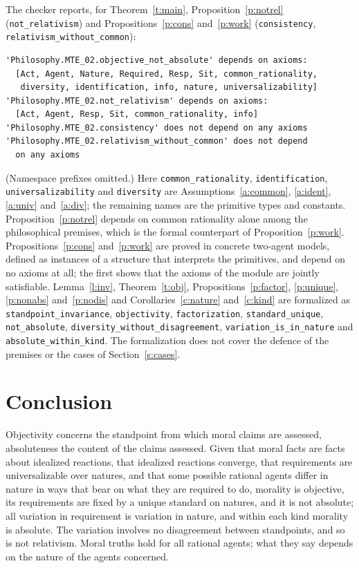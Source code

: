 \documentclass{situationist-preprint}
\begin{document}
\noindent The checker reports, for Theorem~\ref{t:main}, Proposition~\ref{p:notrel} (\texttt{not\_relativism}) and Propositions~\ref{p:cons} and~\ref{p:work} (\texttt{consistency}, \texttt{relativism\_without\_common}):

\begin{lstlisting}
'Philosophy.MTE_02.objective_not_absolute' depends on axioms:
  [Act, Agent, Nature, Required, Resp, Sit, common_rationality,
   diversity, identification, info, nature, universalizability]
'Philosophy.MTE_02.not_relativism' depends on axioms:
  [Act, Agent, Resp, Sit, common_rationality, info]
'Philosophy.MTE_02.consistency' does not depend on any axioms
'Philosophy.MTE_02.relativism_without_common' does not depend
  on any axioms
\end{lstlisting}

\begin{sloppypar}\noindent (Namespace prefixes omitted.) Here \texttt{common\_rationality}, \texttt{identification}, \texttt{universalizability} and \texttt{diversity} are Assumptions~\ref{a:common}, \ref{a:ident}, \ref{a:univ} and~\ref{a:div}; the remaining names are the primitive types and constants. Proposition~\ref{p:notrel} depends on common rationality alone among the philosophical premises, which is the formal counterpart of Proposition~\ref{p:work}. Propositions~\ref{p:cons} and~\ref{p:work} are proved in concrete two-agent models, defined as instances of a structure that interprets the primitives, and depend on no axioms at all; the first shows that the axioms of the module are jointly satisfiable. Lemma~\ref{l:inv}, Theorem~\ref{t:obj}, Propositions~\ref{p:factor}, \ref{p:unique}, \ref{p:nonabs} and~\ref{p:nodis} and Corollaries~\ref{c:nature} and~\ref{c:kind} are formalized as \texttt{standpoint\_invariance}, \texttt{objectivity}, \texttt{factorization}, \texttt{standard\_unique}, \texttt{not\_absolute}, \texttt{diversity\_without\_disagreement}, \texttt{variation\_is\_in\_nature} and \texttt{absolute\_within\_kind}. The formalization does not cover the defence of the premises or the cases of Section~\ref{s:cases}.
\end{sloppypar}

\section{Conclusion}

Objectivity concerns the standpoint from which moral claims are assessed, absoluteness the content of the claims assessed. Given that moral facts are facts about idealized reactions, that idealized reactions converge, that requirements are universalizable over natures, and that some possible rational agents differ in nature in ways that bear on what they are required to do, morality is objective, its requirements are fixed by a unique standard on natures, and it is not absolute; all variation in requirement is variation in nature, and within each kind morality is absolute. The variation involves no disagreement between standpoints, and so is not relativism. Moral truths hold for all rational agents; what they say depends on the nature of the agents concerned.
\end{document}
